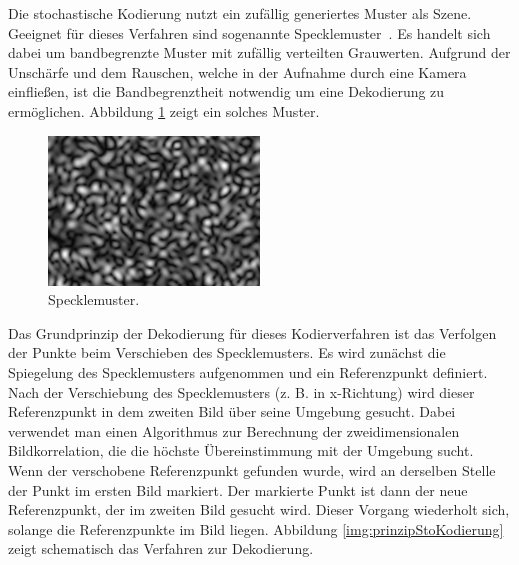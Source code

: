 Die stochastische Kodierung nutzt ein zufällig generiertes Muster als Szene.
Geeignet für dieses Verfahren sind sogenannte \glqq Specklemuster\grqq ~\cite{specklePattern}.
Es handelt sich dabei um bandbegrenzte Muster mit zufällig verteilten Grauwerten.
Aufgrund der Unschärfe und dem Rauschen, welche in der Aufnahme durch eine Kamera einfließen, ist die Bandbegrenztheit notwendig um eine Dekodierung zu ermöglichen.
Abbildung \ref{img:speckleMuster} zeigt ein solches Muster.
%
\begin{figure}[H]
	\centering
	\includegraphics[frame,width=0.5\textwidth]{02_grundlagenZurDeflektometrie/rekonstruktion/stochastischeKodierung/figures/speckleMuster}
	\caption[Specklemuster]{Specklemuster.}
	\label{img:speckleMuster}
\end{figure}
%
\noindent
Das Grundprinzip der Dekodierung für dieses Kodierverfahren ist das Verfolgen der Punkte beim Verschieben des Specklemusters.
Es wird zunächst die Spiegelung des Specklemusters aufgenommen und ein Referenzpunkt definiert.
Nach der Verschiebung des Specklemusters (z. B. in x-Richtung) wird dieser Referenzpunkt in dem zweiten Bild über seine Umgebung gesucht.
Dabei verwendet man einen Algorithmus zur Berechnung der zweidimensionalen Bildkorrelation, die die höchste Übereinstimmung mit der Umgebung sucht.
Wenn der verschobene Referenzpunkt gefunden wurde, wird an derselben Stelle der Punkt im ersten Bild markiert.
Der markierte Punkt ist dann der neue Referenzpunkt, der im zweiten Bild gesucht wird.
Dieser Vorgang wiederholt sich, solange die Referenzpunkte im Bild liegen.
Abbildung \ref{img:prinzipStoKodierung} zeigt schematisch das Verfahren zur Dekodierung.
%
